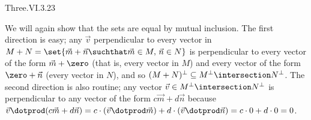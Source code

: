 \begin{ans}{Three.VI.3.23}
\begin{exparts}
        \partsitem We will again show that the sets are equal by mutual
           inclusion.
           The first direction is easy; any $\vec{v}$ perpendicular to
           every vector in
           $M+N=\set{\vec{m}+\vec{n}\suchthat \vec{m}\in M,\, \vec{n}\in N}$
           is perpendicular to every vector of the form $\vec{m}+\zero$
           (that is, every vector in $M$) and every vector of the form
           $\zero+\vec{n}$ (every vector in $N$), and so
           $(M+N)^\perp\subseteq M^\perp\intersection N^\perp$.
           The second direction is also routine; any vector
           $\vec{v}\in M^\perp\intersection N^\perp$
           is perpendicular to any vector of the form $c\vec{m}+d\vec{n}$
           because
           $\vec{v}\dotprod (c\vec{m}+d\vec{n})
             =c\cdot(\vec{v}\dotprod\vec{m})+d\cdot(\vec{v}\dotprod\vec{n})
             =c\cdot 0+d\cdot 0
             =0$.
      \end{exparts}
    
\end{ans}
